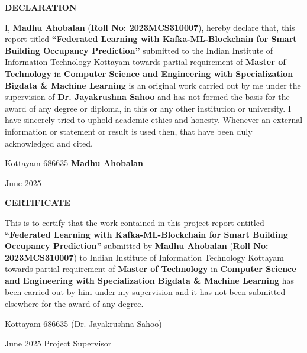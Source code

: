 \documentclass[12pt,a4wide]{report}
\theoremstyle{plain}
\theoremstyle{definition}
\theoremstyle{remark}
\begin{document}
\clearpage
 \setcounter{page}{2}
\begin{center}
{\large{\bf{DECLARATION}}}
\end{center}


\noindent I, \textbf{Madhu Ahobalan} (\textbf{Roll No: 2023MCS310007}), hereby declare that, this report titled
\textbf{``Federated Learning with Kafka-ML-Blockchain for Smart Building Occupancy Prediction''} submitted to the Indian Institute of Information Technology Kottayam towards partial requirement of {\bf Master of Technology} in \textbf{Computer Science and Engineering with Specialization Bigdata \& Machine Learning }
is an original work carried out by me under the supervision of \textbf{Dr. Jayakrushna Sahoo} and has not formed the basis for the award of any degree or diploma, in this or any other institution or
university. I have sincerely tried to uphold academic ethics and honesty. Whenever an external information or statement or result is used then, that have been duly acknowledged and cited.

\vspace{4cm}

\noindent Kottayam-686635 \hfill \textbf{Madhu Ahobalan}

\noindent June 2025

\clearpage


 \setcounter{page}{3}
\begin{center}
{\large{\bf{CERTIFICATE}}}
\end{center}


\noindent This is to certify that the work contained in this
project report entitled \textbf{``Federated Learning with Kafka-ML-Blockchain for Smart Building Occupancy Prediction''}
submitted by \textbf{Madhu Ahobalan} (\textbf{Roll No: 2023MCS310007}) to Indian Institute of Information Technology Kottayam
towards partial requirement of {\bf Master of Technology} in
\textbf{Computer Science and Engineering with Specialization Bigdata \& Machine Learning} has been carried out by him under my supervision and it has not been submitted elsewhere for the award of any degree.


\vspace{4cm}

\noindent Kottayam-686635  \hfill (Dr. Jayakrushna Sahoo)

\noindent June 2025 \hfill Project Supervisor
\end{document}

